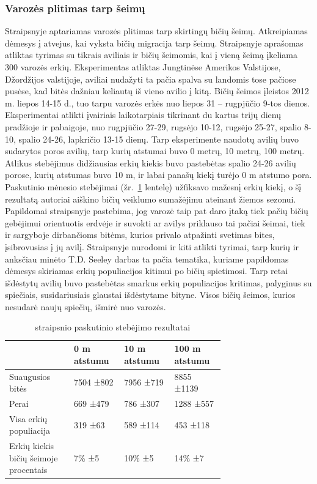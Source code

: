 \documentclass{VUMIFPSmagistrinis}
\begin{document}
\subsubsection{Varozės plitimas tarp šeimų}

Straipsnyje \cite{NoD17} aptariamas varozės plitimas tarp skirtingų bičių šeimų. Atkreipiamas dėmesys į atvejus, kai vyksta bičių migracija tarp šeimų. Straipsnyje aprašomas atliktas tyrimas su tikrais aviliais ir bičių šeimomis, kai į vieną šeimą įkeliama 300 varozės erkių. Eksperimentas atliktas Jungtinėse Amerikos Valstijose, Džordžijos valstijoje, aviliai nudažyti ta pačia spalva su landomis tose pačiose pusėse, kad bitės dažniau keliautų iš vieno avilio į kitą. Bičių šeimos įleistos 2012 m. liepos 14-15 d., tuo tarpu varozės erkės nuo liepos 31 – rugpjūčio 9-tos dienos. Eksperimentai atlikti įvairiais laikotarpiais tikrinant du kartus trijų dienų pradžioje ir pabaigoje, nuo rugpjūčio 27-29, rugsėjo 10-12, rugsėjo 25-27, spalio 8-10, spalio 24-26, lapkričio 13-15 dienų. Tarp eksperimente naudotų avilių buvo sudarytos poros avilių, tarp kurių atstumai buvo 0 metrų, 10 metrų, 100 metrų. Atlikus stebėjimus didžiausias erkių kiekis buvo pastebėtas spalio 24-26 avilių porose, kurių atstumas buvo 10 m, ir labai panašų kiekį turėjo 0 m atstumo pora. Paskutinio mėnesio stebėjimai (žr.~\ref{tab:tva} lentelę) užfiksavo mažesnį erkių kiekį, o šį rezultatą autoriai aiškino bičių veiklumo sumažėjimu ateinant žiemos sezonui.
Papildomai straipsnyje pastebima, jog varozė taip pat daro įtaką tiek pačių bičių gebėjimui orientuotis erdvėje ir suvokti ar avilys priklauso tai pačiai šeimai, tiek ir sargyboje dirbančioms bitėms, kurios privalo atpažinti svetimas bites, įsibrovusias į jų avilį. Straipsnyje nurodomi ir kiti atlikti tyrimai, tarp kurių ir anksčiau minėto T.D. Seeley \cite{SeS15} darbas ta pačia tematika, kuriame papildomas dėmesys skiriamas erkių populiacijos kitimui po bičių spietimosi. Tarp retai išdėstytų avilių buvo pastebėtas smarkus erkių populiacijos kritimas, palyginus su spiečiais, susidariusiais glaustai išdėstytame bityne. Visos bičių šeimos, kurios nesudarė naujų spiečių, išmirė nuo varozės.


\begin{table}[H]\footnotesize
\centering
\caption{\cite{NoD17} straipsnio paskutinio stebėjimo rezultatai}
\label{tab:tva}
\begin{tabular}{p{0.25\linewidth}p{0.15\linewidth}p{0.15\linewidth}p{0.15\linewidth}}
 & 0 m atstumu &	10 m atstumu &	100 m atstumu\\
\hline
Suaugusios bitės &	                    7504 ±802 &	    7956 ±719 &	    8855 ±1139\\
Perai&	                                669 ±479 &  	786 ±307 &	    1288 ±557\\
Visa erkių populiacija&	                319 ±63&	    589 ±114&	    453 ±118\\
Erkių kiekis bičių šeimoje procentais&	7\% ±5&     	10\% ±5&	    14\% ±7\\
\end{tabular}
\end{table}
\end{document}
